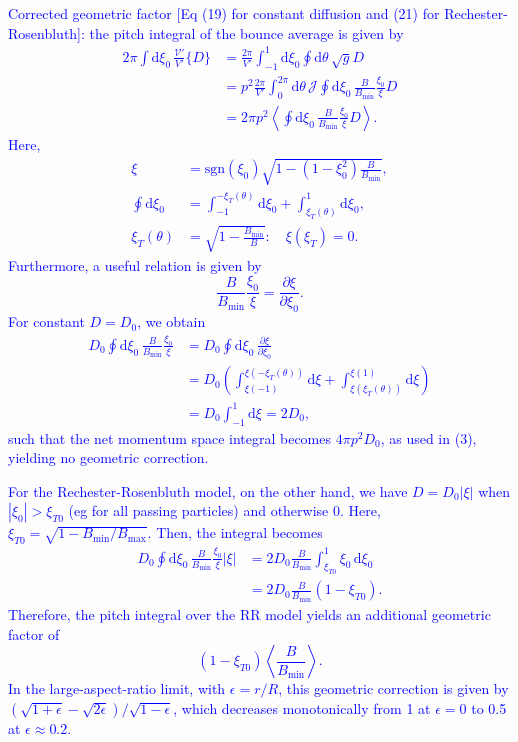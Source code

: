 \documentclass{notes}
\begin{document}
\textcolor{blue}{
Corrected geometric factor [Eq (19) for constant diffusion and (21) for Rechester-Rosenbluth]: 
the pitch integral of the bounce average is given by
\begin{align}
2\pi \int\mathrm{d} \xi_0 \,\frac{\mathcal{V}'}{V'} \{D\} &= \frac{2\pi}{V'}\int_{-1}^1\mathrm{d} \xi_0  \oint \mathrm{d} \theta \,\sqrt{g}D\nonumber\\
&= p^2\frac{2\pi}{V'}\int_{0}^{2\pi}\mathrm{d} \theta  \, \mathcal{J} \oint \mathrm{d} \xi_0 \,\frac{B}{B_\mathrm{min}}\frac{\xi_0}{\xi}D \nonumber \\
&= 2\pi p^2 \left\langle \oint \mathrm{d} \xi_0 \,\frac{B}{B_\mathrm{min}}\frac{\xi_0}{\xi}D \right\rangle.
\end{align}
Here,
\begin{align}
\xi &= \mathrm{sgn}(\xi_0)\sqrt{1-(1-\xi_0^2)\frac{B}{B_\mathrm{min}}}, \nonumber \\
\oint \mathrm{d} \xi_0 &= \int_{-1}^{-\xi_T(\theta)} \mathrm{d}\xi_0+ \int_{\xi_T(\theta)}^1 \mathrm{d}\xi_0, \nonumber \\
\xi_T(\theta) &= \sqrt{1-\frac{B_\mathrm{min}}{B}}: \quad \xi(\xi_T) = 0.
\end{align}
Furthermore, a useful relation is given by
\begin{equation}
\frac{B}{B_\mathrm{min}}\frac{\xi_0}{\xi} = \frac{\partial \xi}{\partial \xi_0}.
\end{equation}
For constant $D = D_0$, we obtain
\begin{align}
D_0 \oint \mathrm{d} \xi_0 \,\frac{B}{B_\mathrm{min}}\frac{\xi_0}{\xi} &= D_0 \oint \mathrm{d} \xi_0 \,\frac{\partial \xi}{\partial \xi_0} \nonumber \\
&= D_0 \left( \int_{\xi(-1)}^{\xi(-\xi_T(\theta))} \mathrm{d}\xi + \int_{\xi(\xi_T(\theta))}^{\xi(1)} \mathrm{d}\xi \right) \nonumber \\
&= D_0 \int_{-1}^1 \mathrm{d}\xi = 2D_0,
\end{align}
such that the net momentum space integral becomes $4\pi p^2 D_0$, as used in (3), yielding no geometric correction.
}

\textcolor{blue}{ 
For the Rechester-Rosenbluth model, on the other hand, we have $D = D_0 |\xi|$ when $|\xi_0| > \xi_{T0}$ (eg for all passing particles) and otherwise 0. Here, $\xi_{T0} = \sqrt{1-B_\mathrm{min}/B_\mathrm{max}}$. Then, the integral becomes
\begin{align}
D_0 \oint \mathrm{d} \xi_0 \,\frac{B}{B_\mathrm{min}}\frac{\xi_0}{\xi} |\xi|  
&= 2D_0 \frac{B}{B_\mathrm{min}} \int_{\xi_{T0}}^1 \xi_0 \, \mathrm{d}\xi_0 \nonumber \\
&= 2D_0 \frac{B}{B_\mathrm{min}}(1-\xi_{T0}).
\end{align}
Therefore, the pitch integral over the RR model yields an additional geometric factor of
\begin{equation}
(1-\xi_{T0}) \left\langle \frac{B}{B_\mathrm{min}} \right\rangle.
\end{equation}
In the large-aspect-ratio limit, with $\epsilon = r/R$, this geometric correction is given by $(\sqrt{1+\epsilon}-\sqrt{2\epsilon})/\sqrt{1-\epsilon}$, which decreases monotonically from 1 at $\epsilon=0$ to 0.5 at $\epsilon \approx 0.2$. 
}
\end{document}
